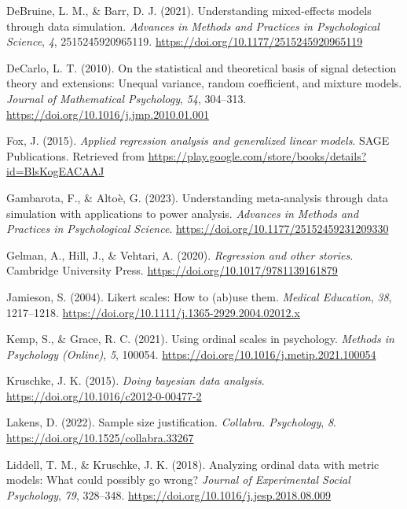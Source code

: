 \documentclass[
  man,floatsintext]{apa6}
\newlength{\cslhangindent}
\newenvironment{CSLReferences}[2] %
 {\begin{list}{}{%
  \setlength{\itemindent}{0pt}
  \setlength{\leftmargin}{0pt}
  \setlength{\parsep}{0pt}
  \ifodd #1
   \setlength{\leftmargin}{\cslhangindent}
   \setlength{\itemindent}{-1\cslhangindent}
  \fi
  \setlength{\itemsep}{#2\baselineskip}}}
 {\end{list}}
\begin{document}
\begin{CSLReferences}{1}{0}
DeBruine, L. M., \& Barr, D. J. (2021). Understanding mixed-effects models through data simulation. \emph{Advances in Methods and Practices in Psychological Science}, \emph{4}, 2515245920965119. \url{https://doi.org/10.1177/2515245920965119}

DeCarlo, L. T. (2010). On the statistical and theoretical basis of signal detection theory and extensions: Unequal variance, random coefficient, and mixture models. \emph{Journal of Mathematical Psychology}, \emph{54}, 304--313. \url{https://doi.org/10.1016/j.jmp.2010.01.001}

Fox, J. (2015). \emph{Applied regression analysis and generalized linear models}. SAGE Publications. Retrieved from \url{https://play.google.com/store/books/details?id=BlsKogEACAAJ}

Gambarota, F., \& Altoè, G. (2023). Understanding meta-analysis through data simulation with applications to power analysis. \emph{Advances in Methods and Practices in Psychological Science}. \url{https://doi.org/10.1177/25152459231209330}

Gelman, A., Hill, J., \& Vehtari, A. (2020). \emph{Regression and other stories}. Cambridge University Press. \url{https://doi.org/10.1017/9781139161879}

Jamieson, S. (2004). Likert scales: How to (ab)use them. \emph{Medical Education}, \emph{38}, 1217--1218. \url{https://doi.org/10.1111/j.1365-2929.2004.02012.x}

Kemp, S., \& Grace, R. C. (2021). Using ordinal scales in psychology. \emph{Methods in Psychology (Online)}, \emph{5}, 100054. \url{https://doi.org/10.1016/j.metip.2021.100054}

Kruschke, J. K. (2015). \emph{Doing bayesian data analysis}. \url{https://doi.org/10.1016/c2012-0-00477-2}

Lakens, D. (2022). Sample size justification. \emph{Collabra. Psychology}, \emph{8}. \url{https://doi.org/10.1525/collabra.33267}

Liddell, T. M., \& Kruschke, J. K. (2018). Analyzing ordinal data with metric models: What could possibly go wrong? \emph{Journal of Experimental Social Psychology}, \emph{79}, 328--348. \url{https://doi.org/10.1016/j.jesp.2018.08.009}


\end{CSLReferences}
\end{document}

